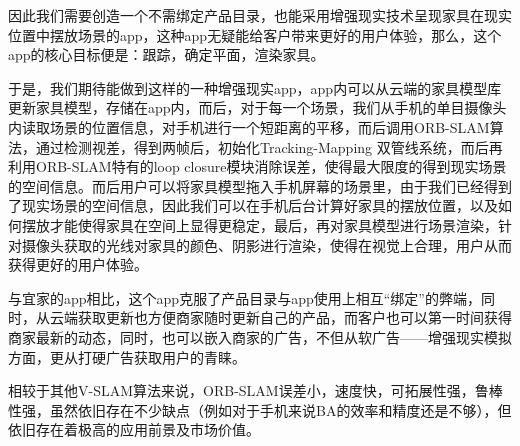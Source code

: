 因此我们需要创造一个不需绑定产品目录，也能采用增强现实技术呈现家具在现实位置中摆放场景的app，这种app无疑能给客户带来更好的用户体验，那么，这个app的核心目标便是：跟踪，确定平面，渲染家具。

于是，我们期待能做到这样的一种增强现实app，app内可以从云端的家具模型库更新家具模型，存储在app内，而后，对于每一个场景，我们从手机的单目摄像头内读取场景的位置信息，对手机进行一个短距离的平移，而后调用ORB-SLAM算法，通过检测视差，得到两帧后，初始化Tracking-Mapping 双管线系统，而后再利用ORB-SLAM特有的loop closure模块消除误差，使得最大限度的得到现实场景的空间信息。而后用户可以将家具模型拖入手机屏幕的场景里，由于我们已经得到了现实场景的空间信息，因此我们可以在手机后台计算好家具的摆放位置，以及如何摆放才能使得家具在空间上显得更稳定，最后，再对家具模型进行场景渲染，针对摄像头获取的光线对家具的颜色、阴影进行渲染，使得在视觉上合理，用户从而获得更好的用户体验。

与宜家的app相比，这个app克服了产品目录与app使用上相互“绑定”的弊端，同时，从云端获取更新也方便商家随时更新自己的产品，而客户也可以第一时间获得商家最新的动态，同时，也可以嵌入商家的广告，不但从软广告——增强现实模拟方面，更从打硬广告获取用户的青睐。

相较于其他V-SLAM算法来说，ORB-SLAM误差小，速度快，可拓展性强，鲁棒性强，虽然依旧存在不少缺点（例如对于手机来说BA的效率和精度还是不够），但依旧存在着极高的应用前景及市场价值。

